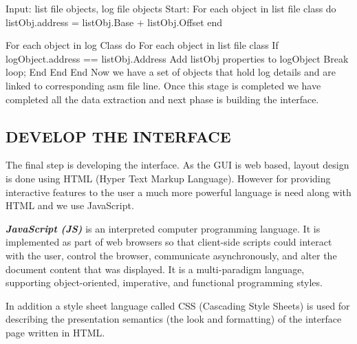 \vspace{2cm}
Input: list file objects, log file objects
Start:
For each object in list file class do
	listObj.address = listObj.Base + listObj.Offset
end

For each object in log Class do
	For each object in list file class
		If logObject.address == listObj.Address
			Add listObj properties to logObject
			Break loop;
	End
	End
End
Now we have a set of objects that hold log details and are linked to corresponding asm file line. Once this stage is completed we have completed all the data extraction and next phase is building the interface.

\subsection {DEVELOP THE INTERFACE}

The final step is developing the interface. As the GUI is web based, layout design is done using HTML (Hyper Text Markup Language). However for providing interactive features to the user a much more powerful language is need along with HTML and we use JavaScript.

\emph {\bf JavaScript (JS)} is an interpreted computer programming language. It is  implemented as part of web browsers so that client-side scripts could interact with the user, control the browser, communicate asynchronously, and alter the document content that was displayed. It is a multi-paradigm language, supporting object-oriented, imperative, and functional programming styles.

In addition a style sheet language called CSS (Cascading Style Sheets) is used for describing the presentation semantics (the look and formatting) of the interface page written in HTML.

